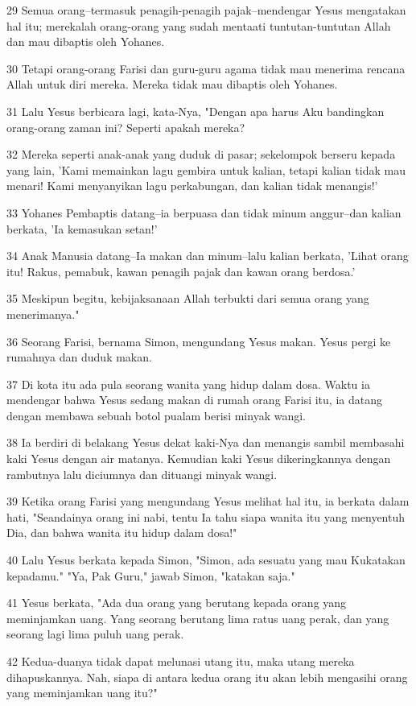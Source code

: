 \par 29 Semua orang--termasuk penagih-penagih pajak--mendengar Yesus mengatakan hal itu; merekalah orang-orang yang sudah mentaati tuntutan-tuntutan Allah dan mau dibaptis oleh Yohanes.
\par 30 Tetapi orang-orang Farisi dan guru-guru agama tidak mau menerima rencana Allah untuk diri mereka. Mereka tidak mau dibaptis oleh Yohanes.
\par 31 Lalu Yesus berbicara lagi, kata-Nya, "Dengan apa harus Aku bandingkan orang-orang zaman ini? Seperti apakah mereka?
\par 32 Mereka seperti anak-anak yang duduk di pasar; sekelompok berseru kepada yang lain, 'Kami memainkan lagu gembira untuk kalian, tetapi kalian tidak mau menari! Kami menyanyikan lagu perkabungan, dan kalian tidak menangis!'
\par 33 Yohanes Pembaptis datang--ia berpuasa dan tidak minum anggur--dan kalian berkata, 'Ia kemasukan setan!'
\par 34 Anak Manusia datang--Ia makan dan minum--lalu kalian berkata, 'Lihat orang itu! Rakus, pemabuk, kawan penagih pajak dan kawan orang berdosa.'
\par 35 Meskipun begitu, kebijaksanaan Allah terbukti dari semua orang yang menerimanya."
\par 36 Seorang Farisi, bernama Simon, mengundang Yesus makan. Yesus pergi ke rumahnya dan duduk makan.
\par 37 Di kota itu ada pula seorang wanita yang hidup dalam dosa. Waktu ia mendengar bahwa Yesus sedang makan di rumah orang Farisi itu, ia datang dengan membawa sebuah botol pualam berisi minyak wangi.
\par 38 Ia berdiri di belakang Yesus dekat kaki-Nya dan menangis sambil membasahi kaki Yesus dengan air matanya. Kemudian kaki Yesus dikeringkannya dengan rambutnya lalu diciumnya dan dituangi minyak wangi.
\par 39 Ketika orang Farisi yang mengundang Yesus melihat hal itu, ia berkata dalam hati, "Seandainya orang ini nabi, tentu Ia tahu siapa wanita itu yang menyentuh Dia, dan bahwa wanita itu hidup dalam dosa!"
\par 40 Lalu Yesus berkata kepada Simon, "Simon, ada sesuatu yang mau Kukatakan kepadamu." "Ya, Pak Guru," jawab Simon, "katakan saja."
\par 41 Yesus berkata, "Ada dua orang yang berutang kepada orang yang meminjamkan uang. Yang seorang berutang lima ratus uang perak, dan yang seorang lagi lima puluh uang perak.
\par 42 Kedua-duanya tidak dapat melunasi utang itu, maka utang mereka dihapuskannya. Nah, siapa di antara kedua orang itu akan lebih mengasihi orang yang meminjamkan uang itu?"
